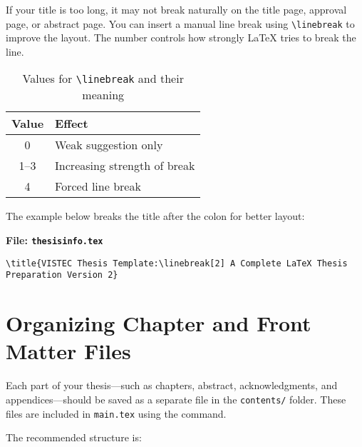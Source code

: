 \documentclass{VISTEC}
\begin{document}
\begin{paragraph}
If your title is too long, it may not break naturally on the title page, approval page, or abstract page. You can insert a manual line break using \verb|\linebreak| to improve the layout. The number controls how strongly LaTeX tries to break the line.
\end{paragraph}

\begin{table}[ht]
\small\singlespacingplus
\centering
\caption{Values for \texttt{\textbackslash linebreak} and their meaning}
\begin{tabular}{cl}
\toprule
\textbf{Value} & \textbf{Effect} \\
\midrule
0 & Weak suggestion only \\
1–3 & Increasing strength of break \\
4 & Forced line break \\
\bottomrule
\end{tabular}
\end{table}

\begin{paragraph}
The example below breaks the title after the colon for better layout:
\end{paragraph}

\noindent\textbf{File: \texttt{thesisinfo.tex}}\vspace{-1.5em}
\begin{verbatim}
\title{VISTEC Thesis Template:\linebreak[2] A Complete LaTeX Thesis Preparation Version 2}
\end{verbatim}


\section{Organizing Chapter and Front Matter Files}
\label{manual:chapters}

\begin{paragraph}
Each part of your thesis—such as chapters, abstract, acknowledgments, and appendices—should be saved as a separate file in the \texttt{contents/} folder. These files are included in \texttt{main.tex} using the \verb|| command.
\end{paragraph}

\begin{paragraph}
The recommended structure is:
\end{paragraph}
\end{document}
